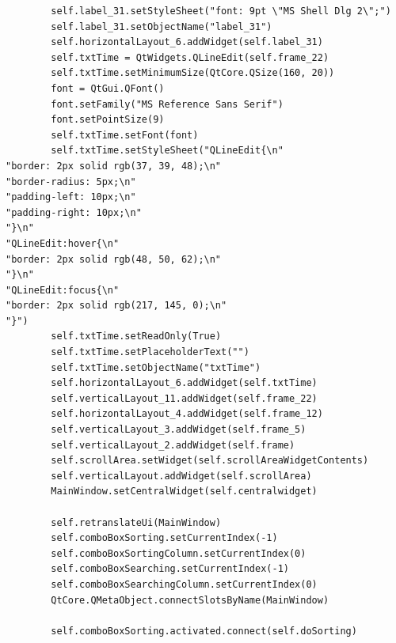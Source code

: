 \documentclass[12pt]{article}
\begin{document}
\begin{verbatim}
        self.label_31.setStyleSheet("font: 9pt \"MS Shell Dlg 2\";")
        self.label_31.setObjectName("label_31")
        self.horizontalLayout_6.addWidget(self.label_31)
        self.txtTime = QtWidgets.QLineEdit(self.frame_22)
        self.txtTime.setMinimumSize(QtCore.QSize(160, 20))
        font = QtGui.QFont()
        font.setFamily("MS Reference Sans Serif")
        font.setPointSize(9)
        self.txtTime.setFont(font)
        self.txtTime.setStyleSheet("QLineEdit{\n"
"border: 2px solid rgb(37, 39, 48);\n"
"border-radius: 5px;\n"
"padding-left: 10px;\n"
"padding-right: 10px;\n"
"}\n"
"QLineEdit:hover{\n"
"border: 2px solid rgb(48, 50, 62);\n"
"}\n"
"QLineEdit:focus{\n"
"border: 2px solid rgb(217, 145, 0);\n"
"}")
        self.txtTime.setReadOnly(True)
        self.txtTime.setPlaceholderText("")
        self.txtTime.setObjectName("txtTime")
        self.horizontalLayout_6.addWidget(self.txtTime)
        self.verticalLayout_11.addWidget(self.frame_22)
        self.horizontalLayout_4.addWidget(self.frame_12)
        self.verticalLayout_3.addWidget(self.frame_5)
        self.verticalLayout_2.addWidget(self.frame)
        self.scrollArea.setWidget(self.scrollAreaWidgetContents)
        self.verticalLayout.addWidget(self.scrollArea)
        MainWindow.setCentralWidget(self.centralwidget)

        self.retranslateUi(MainWindow)
        self.comboBoxSorting.setCurrentIndex(-1)
        self.comboBoxSortingColumn.setCurrentIndex(0)
        self.comboBoxSearching.setCurrentIndex(-1)
        self.comboBoxSearchingColumn.setCurrentIndex(0)
        QtCore.QMetaObject.connectSlotsByName(MainWindow)

        self.comboBoxSorting.activated.connect(self.doSorting)



\end{verbatim}
\end{document}
